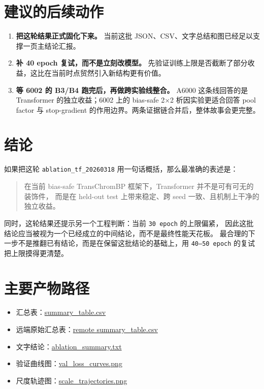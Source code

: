 \documentclass[11pt,a4paper]{ctexart}
\begin{document}
\section{建议的后续动作}

\begin{enumerate}[leftmargin=2em]
  \item \textbf{把这轮结果正式固化下来。}
  当前这批 JSON、CSV、文字总结和图已经足以支撑一页主结论汇报。

  \item \textbf{补 40 epoch 复试，而不是立刻改模型。}
  先验证训练上限是否截断了部分收益，这比在当前时点贸然引入新结构更有价值。

  \item \textbf{等 6002 的 B3/B4 跑完后，再做跨实验线整合。}
  A6000 这条线回答的是 Transformer 的独立收益；6002 上的 bias-safe 2$\times$2 析因实验更适合回答
  pool factor 与 stop-gradient 的作用边界。两条证据链合并后，整体故事会更完整。
\end{enumerate}

\section{结论}

如果把这轮 \texttt{ablation\_tf\_20260318} 用一句话概括，那么最准确的表述是：
\begin{quote}
在当前 bias-safe TransChromBP 框架下，Transformer 并不是可有可无的装饰件，
而是在 held-out test 上带来稳定、跨 seed 一致、且机制上干净的独立收益。
\end{quote}

同时，这轮结果还提示另一个工程判断：当前 \texttt{30 epoch} 的上限偏紧，
因此这批结论应当被视为一个已经成立的中间结论，而不是最终性能天花板。
最合理的下一步不是推翻已有结论，而是在保留这批结论的基础上，用
\texttt{40--50 epoch} 的复试把上限摸得更清楚。

\appendix

\section{主要产物路径}

\begin{itemize}[leftmargin=2em]
  \item 汇总表：\href{/home/zhengwei/project/python/TransChromBP/reports/assets/ablation_tf_20260318/summary_table.csv}{summary\_table.csv}
  \item 远端原始汇总表：\href{/data1/zhoujiazhen/bylw_atac/TransChromBP/outputs/reports/ablation_tf_20260318/summary_table.csv}{remote summary\_table.csv}
  \item 文字结论：\href{/home/zhengwei/project/python/TransChromBP/reports/assets/ablation_tf_20260318/ablation_summary.txt}{ablation\_summary.txt}
  \item 验证曲线图：\href{/home/zhengwei/project/python/TransChromBP/reports/assets/ablation_tf_20260318/val_loss_curves.png}{val\_loss\_curves.png}
  \item 尺度轨迹图：\href{/home/zhengwei/project/python/TransChromBP/reports/assets/ablation_tf_20260318/scale_trajectories.png}{scale\_trajectories.png}
\end{itemize}
\end{document}
